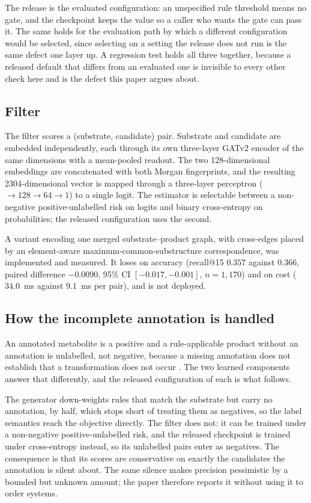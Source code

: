 \documentclass[journal=jcisd8,manuscript=suppinfo,layout=onecolumn]{achemso}
\begin{document}
The release is the evaluated configuration: an unspecified rule threshold means no gate, and the
checkpoint keeps the value so a caller who wants the gate can pass it. The same holds for the
evaluation path by which a different configuration would be selected, since selecting on a
setting the release does not run is the same defect one layer up. A regression test holds all
three together, because a released default that differs from an evaluated one is invisible to
every other check here and is the defect this paper argues about.

\subsection{Filter}

The filter scores a (substrate, candidate) pair. Substrate and candidate are embedded
independently, each through its own three-layer GATv2 encoder of the same dimensions with a
mean-pooled readout. The two 128-dimensional embeddings are concatenated with both Morgan
fingerprints, and the resulting 2304-dimensional vector is mapped through a three-layer perceptron
($\to 128 \to 64 \to 1$) to a single logit. The estimator is selectable between a non-negative
positive-unlabelled risk on logits and binary cross-entropy on probabilities; the released
configuration uses the second.

A variant encoding one merged substrate--product graph, with cross-edges placed by an
element-aware maximum-common-substructure correspondence, was implemented and measured. It loses
on accuracy (recall@15 $0.357$ against $0.366$, paired difference $-0.0090$, 95\% CI
$[-0.017, -0.001]$, $n = 1{,}170$) and on cost ($34.0$~ms against $9.1$~ms per pair), and is not
deployed.

\subsection{How the incomplete annotation is handled}

An annotated metabolite is a positive and a rule-applicable product without an annotation is
unlabelled, not negative, because a missing annotation does not establish that a transformation
does not occur \citep{Jain_2016}. The two learned components answer that differently, and the
released configuration of each is what follows.

The generator down-weights rules that match the substrate but carry no annotation, by half, which
stops short of treating them as negatives, so the label semantics reach the objective directly. The
filter
does not: it can be trained under a non-negative positive-unlabelled risk, and the released
checkpoint is trained under cross-entropy instead, so its unlabelled pairs enter as negatives. The
consequence is that its scores are conservative on exactly the candidates the annotation is silent
about. The same silence makes precision pessimistic by a bounded but unknown amount; the paper
therefore reports it without using it to order systems.
\end{document}
